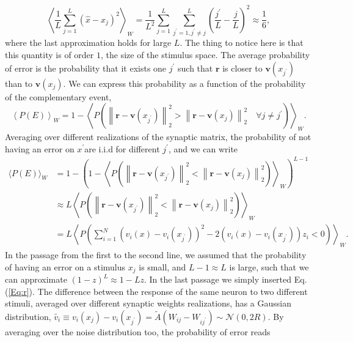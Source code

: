 \documentclass[a4paper]{article}%
\begin{document}
\begin{equation}
\left\langle \frac{1}{L}\sum_{j=1}^{L} (\hat{x}-x_{j})^{2}\right\rangle _{W}
=\frac{1}{L^{2}}\sum_{j=1}^{L} \sum_{j^{\prime}=1,j^{\prime}\neq j}^{L}
\left(  \frac{j^{\prime}} {L}-\frac{j}{L}\right)  ^{2} \approx\frac{1}{6},
\end{equation}
where the last approximation holds for large $L$. The thing to notice here is
that this quantity is of order $1$, the size of the stimulus space. The
average probability of error is the probability that it exists one $j^{\prime
}$ such that $\mathbf{r}$ is closer to $\mathbf{v}(x_{j^{\prime}})$ than to
$\mathbf{v}(x_{j})$. We can express this probability as a function of the
probability of the complementary event,
\begin{equation}
\left\langle P(E)\right\rangle _{W} = 1 - \left\langle P\left(  \left\|
\mathbf{r}-\mathbf{v}(x_{j^{\prime}})\right\|  _{2}^{2} >\left\|  \mathbf{r}
-\mathbf{v}(x_{j})\right\|  _{2}^{2} \quad\forall j \neq j^{\prime}\right)
\right\rangle _{W}.
\end{equation}
Averaging over different realizations of the synaptic matrix, the probability
of not having an error on $x^{\prime}$are i.i.d for different $j^{\prime}$,
and we can write
\begin{equation}%
\begin{split}
\langle P(E)\rangle_{W}  &  = 1 - \left(  1 - \left\langle P\left(  \left\|
\mathbf{r}-\mathbf{v}(x_{j^{\prime}})\right\|  _{2}^{2} < \left\|  \mathbf{r}
-\mathbf{v}(x_{j})\right\|  _{2}^{2} \right)  \right\rangle _{W}\right)
^{L-1}\\
&  \approx L \left\langle P\left(  \left\|  \mathbf{r}-\mathbf{v}%
(x_{j^{\prime}})\right\|  _{2}^{2} < \left\|  \mathbf{r} -\mathbf{v}%
(x_{j})\right\|  _{2}^{2} \right)  \right\rangle _{W}\\
&  = L \left\langle P\left(  \sum_{i=1}^{N} \left(  v_{i} (x)- v_{i}%
(x_{j^{\prime}})\right)  ^{2} - 2\left(  v_{i}(x)-v_{i}(x_{j^{\prime}%
})\right)  z_{i} < 0 \right)  \right\rangle _{W}.
\end{split}
\end{equation}
In the passage from the first to the second line, we assumed that the
probability of having an error on a stimulus $x_{j}$ is small, and $L-1
\approx L$ is large, such that we can approximate $(1-z)^{L} \approx1 -Lz$. In
the last passage we simply inserted Eq. (\ref{Eq:r}). The difference between
the response of the same neuron to two different stimuli, averaged over
different synaptic weights realizations, has a Gaussian distribution,
$\tilde{v_{i}} \equiv v_{i}(x_{j})-v_{i}(x_{j^{\prime}}) = \tilde{A}(W_{ij}
-W_{ij^{\prime}}) \sim\mathcal{N}(0,2R)$. By averaging over the noise
distribution too, the probability of error reads%
\end{document}
